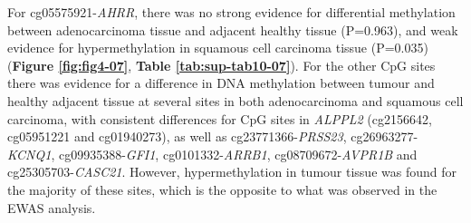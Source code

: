 \documentclass[11pt,oneside]{bristolthesis}
\begin{document}
For cg05575921-\emph{AHRR}, there was no strong evidence for differential methylation between adenocarcinoma tissue and adjacent healthy tissue (P=0.963), and weak evidence for hypermethylation in squamous cell carcinoma tissue (P=0.035) (\textbf{Figure \ref{fig:fig4-07}}, \textbf{Table \ref{tab:sup-tab10-07}}). For the other CpG sites there was evidence for a difference in DNA methylation between tumour and healthy adjacent tissue at several sites in both adenocarcinoma and squamous cell carcinoma, with consistent differences for CpG sites in \emph{ALPPL2} (cg2156642, cg05951221 and cg01940273), as well as cg23771366-\emph{PRSS23}, cg26963277-\emph{KCNQ1}, cg09935388-\emph{GFI1}, cg0101332-\emph{ARRB1}, cg08709672-\emph{AVPR1B} and cg25305703-\emph{CASC21}. However, hypermethylation in tumour tissue was found for the majority of these sites, which is the opposite to what was observed in the EWAS analysis.
\end{document}
